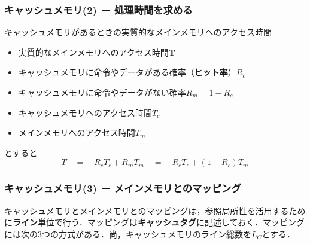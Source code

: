 \subsubsection{キャッシュメモリ(2) － 処理時間を求める}\label{sec:com_arch-2-D-10}

\begin{kousiki}{キャッシュメモリがあるときの実質的なメインメモリへのアクセス時間}
	\begin{itemize}
		\item \textsf{実質的なメインメモリへのアクセス時間$\bm{T}$}
		\item キャッシュメモリに命令やデータがある確率（\textbf{ヒット率}）$R_c$
		\item キャッシュメモリに命令やデータがない確率$R_m = 1 - R_c$
		\item キャッシュメモリへのアクセス時間$T_c$
		\item メインメモリへのアクセス時間$T_m$
	\end{itemize}
	とすると
	\begin{equation}
		T \quad = \quad R_c T_c + R_m T_m \quad = \quad R_c T_c + (1 - R_c) T_m
	\end{equation}
\end{kousiki}



\subsubsection{キャッシュメモリ(3) － メインメモリとのマッピング}\label{sec:com_arch-2-D-11}

キャッシュメモリとメインメモリとのマッピングは，参照局所性を活用するために\textbf{ライン}単位で行う．マッピングは\textbf{キャッシュタグ}に記述しておく．マッピングには次の3つの方式がある．尚，キャッシュメモリのライン総数を$L_C$とする．


